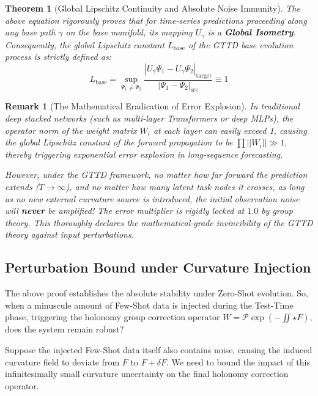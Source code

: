 \documentclass{article}
\newtheorem{theorem}{Theorem}[section]
\newtheorem{remark}{Remark}[section]
\begin{document}
\begin{theorem}[Global Lipschitz Continuity and Absolute Noise Immunity]
The above equation rigorously proves that for time-series predictions proceeding along any base path $\gamma$ on the base manifold, its mapping $U_\gamma$ is a \textbf{Global Isometry}. Consequently, the global Lipschitz constant $L_{\text{base}}$ of the GTTD base evolution process is strictly defined as:
\begin{equation}
L_{\text{base}} = \sup_{\Psi_1 \neq \Psi_2} \frac{|U_\gamma \Psi_1 - U_\gamma \Psi_2|_{\text{target}}}{|\Psi_1 - \Psi_2|_{\text{src}}} \equiv 1
\end{equation}
\end{theorem}

\begin{remark}[The Mathematical Eradication of Error Explosion]
In traditional deep stacked networks (such as multi-layer Transformers or deep MLPs), the operator norm of the weight matrix $W_i$ at each layer can easily exceed 1, causing the global Lipschitz constant of the forward propagation to be $\prod ||W_i|| \gg 1$, thereby triggering exponential error explosion in long-sequence forecasting.

However, under the GTTD framework, no matter how far forward the prediction extends ($T \to \infty$), and no matter how many latent task nodes it crosses, as long as no new external curvature source is introduced, the initial observation noise will \textbf{never} be amplified! The error multiplier is rigidly locked at $1.0$ by group theory. This thoroughly declares the mathematical-grade invincibility of the GTTD theory against input perturbations.
\end{remark}

\subsection{Perturbation Bound under Curvature Injection}

The above proof establishes the absolute stability under Zero-Shot evolution. So, when a minuscule amount of Few-Shot data is injected during the Test-Time phase, triggering the holonomy group correction operator $W = \mathcal{P}\exp(-\iint \star F)$, does the system remain robust?

Suppose the injected Few-Shot data itself also contains noise, causing the induced curvature field to deviate from $F$ to $F + \delta F$. We need to bound the impact of this infinitesimally small curvature uncertainty on the final holonomy correction operator.
\end{document}
